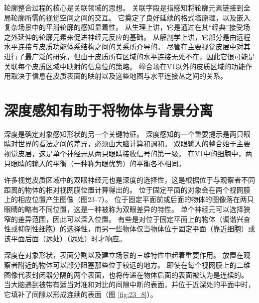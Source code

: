 轮廓整合过程的核心是关联领域的思想。 
关联字段是指感知将轮廓元素链接到全局轮廓所需的视觉空间之间的交互。 
它奠定了良好延续的格式塔原理，以及嵌入复杂场景中的平滑轮廓的感知显着性。 
从生理上讲，它是通过在其“经典”接受场之外延伸的轮廓元素来促进神经元反应的基础。
从解剖学上讲，它部分是由远程水平连接与皮质功能体系结构之间的关系所介导的。
尽管在主要视觉皮层中对其进行了最广泛的研究，但由于皮质所有区域的水平连接无处不在，因此它很可能是关联每个皮质区域中映射的信息位的策略。 
缔合场在V1以外的皮质区域的功能作用取决于信息在皮质表面的映射以及这些地图与水平连接丛之间的关系。


\section{深度感知有助于将物体与背景分离}

深度是确定对象感知形状的另一个关键特征。
深度感知的一个重要提示是两只眼睛对世界的看法之间的差异，必须由大脑计算和调和。
双眼输入的整合始于主要视觉皮层，这是单个神经元从两只眼睛接收信号的第一级。 
在V1中的细胞中，两只眼睛的输入的平衡（一种称为眼优势）的平衡各不相同。


许多视觉皮质区域中的双眼神经元也是深度的选择性，这是根据位于与观察者不同距离的物体的相对视网膜位置计算得出的。 
位于固定平面的对象会在两个视网膜上的相应位置产生图像（图23–7）。
位于固定平面前或后面的物体的图像落在两只眼睛的略有不同位置，这是一种被称为双眼差异的特性。
单个神经元可以选择狭窄的差异范围，因此可以深入位置。
有些是对位于固定平面上的物体（调谐兴奋性或抑制性细胞）的选择性，而另一些物体仅当物体位于固定平面（靠近细胞）或该平面后面（远处）（远处）时才响应。


深度在对象形状，表面分割以及建立场景的三维特性中起着重要作用。
放置在观察者附近的物体可以部分阻塞那些位于较远的地方。
即使在每个视网膜上的二维图像代表封闭器分隔的两个表面，也将传递在物体后面的表面被认为是连续的。
当大脑遇到被带有适当对准和对比的间隙中断的表面，并位于近深处的平面中时，它填补了间隙以形成连续的表面（图 \ref{fig:23_8}）。

